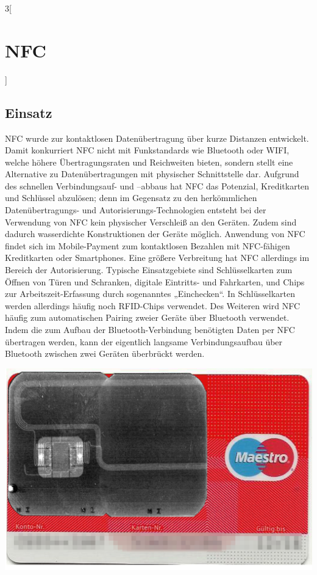 \begin{multicols}{3}[\section{NFC}]
\subsection*{Einsatz}
NFC wurde zur kontaktlosen Datenübertragung über kurze Distanzen entwickelt. Damit konkurriert NFC nicht mit Funkstandards wie Bluetooth oder WIFI, welche höhere Übertragungsraten und Reichweiten bieten, sondern stellt eine Alternative zu Datenübertragungen mit physischer Schnittstelle dar. Aufgrund des schnellen Verbindungsauf- und –abbaus hat NFC das Potenzial, Kreditkarten und Schlüssel abzulösen; denn im Gegensatz zu den herkömmlichen Datenübertragungs- und Autorisierungs-Technologien entsteht bei der Verwendung von NFC kein physischer Verschleiß an den Geräten. Zudem sind dadurch wasserdichte Konstruktionen der Geräte möglich.
Anwendung von NFC findet sich im Mobile-Payment zum kontaktlosen Bezahlen mit NFC-fähigen Kreditkarten oder Smartphones. Eine größere Verbreitung hat NFC allerdings im Bereich der Autorisierung. Typische Einsatzgebiete sind Schlüsselkarten zum Öffnen von Türen und Schranken, digitale Eintritts- und Fahrkarten, und Chips zur Arbeitszeit-Erfassung durch sogenanntes „Einchecken“. In Schlüsselkarten werden allerdings häufig noch RFID-Chips verwendet. Des Weiteren wird NFC häufig zum automatischen Pairing zweier Geräte über Bluetooth verwendet. Indem die zum Aufbau der Bluetooth-Verbindung benötigten Daten per NFC übertragen werden, kann der eigentlich langsame Verbindungsaufbau über Bluetooth zwischen zwei Geräten überbrückt werden.~\cite{nfc.1,nfc.2,nfc.10}

\begin{Figure}
\includegraphics[width=\linewidth]{Kapitel/NFC/Grafiken/girogo.jpg}
\label{fig:nfc.girogo}
\end{Figure}


\end{multicols}
\newpage
